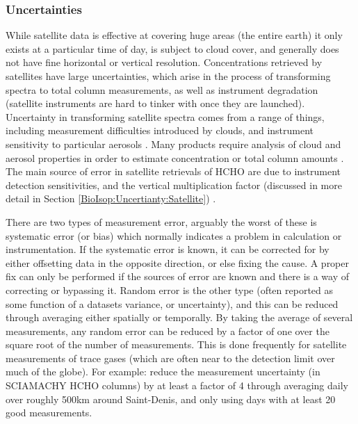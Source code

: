     \subsubsection{Uncertainties}
      While satellite data is effective at covering huge areas (the entire earth) it only exists at a particular time of day, is subject to cloud cover, and generally does not have fine horizontal or vertical resolution.
      Concentrations retrieved by satellites have large uncertainties, which arise in the process of transforming spectra to total column measurements, as well as instrument degradation (satellite instruments are hard to tinker with once they are launched).
      Uncertainty in transforming satellite spectra comes from a range of things, including measurement difficulties introduced by clouds, and instrument sensitivity to particular aerosols \citep{Millet2006}.
      Many products require analysis of cloud and aerosol properties in order to estimate concentration or total column amounts \citep{Palmer2001,Palmer2003, Marais2012, Vasilkov2017}.
      The main source of error in satellite retrievals of HCHO are due to instrument detection sensitivities, and the vertical multiplication factor (discussed in more detail in Section \ref{BioIsop:Uncertianty:Satellite}) \citep{Millet2006}.
      
      There are two types of measurement error, arguably the worst of these is systematic error (or bias) which normally indicates a problem in calculation or instrumentation.
      If the systematic error is known, it can be corrected for by either offsetting data in the opposite direction, or else fixing the cause.
      A proper fix can only be performed if the sources of error are known and there is a way of correcting or bypassing it.
      Random error is the other type (often reported as some function of a datasets variance, or uncertainty), and this can be reduced through averaging either spatially or temporally. 
      By taking the average of several measurements, any random error can be reduced by a factor of one over the square root of the number of measurements.
      This is done frequently for satellite measurements of trace gases (which are often near to the detection limit over much of the globe).
      For example: \cite{Vigouroux2009} reduce the measurement uncertainty (in SCIAMACHY HCHO columns) by at least a factor of 4 through averaging daily over roughly 500km around Saint-Denis, and only using days with at least 20 good measurements.
      
